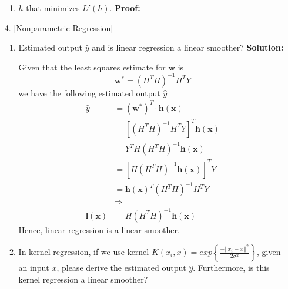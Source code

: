 \documentclass{article}
\renewcommand{\b}[1]{\bm{#1}}
\begin{document}
\begin{enumerate}
\begin{enumerate}
		      \item $h$ that minimizes $L'(h)$.\newline
		      {\bf Proof:}
          \par 
	      \end{enumerate}
	\item [4.] [Nonparametric Regression]
	      \begin{enumerate}
		      \setlength\parindent{2em}
		      \item Estimated output $\hat{y}$ and is linear regression a linear smoother?\newline
		      {\bf Solution:}
          \par Given that the least squares estimate for $\b{w}$ is 
          \[\b{w}^*=\left(H^TH\right)^{-1}H^TY\]
          we have the following estimated output $\hat{y}$
          \begin{align*}
            \hat{y} &= (\b{w}^*)^T\cdot\b{h(x)}\\
            &= \left[\left(H^TH\right)^{-1}H^TY\right]^T\b{h(x)}\\
            &= Y^TH\left(H^TH\right)^{-1}\b{h(x)}\\
            &= \left[H\left(H^TH\right)^{-1}\b{h(x)}\right]^TY\\
            &= \b{h(x)}^T\left(H^TH\right)^{-1}H^TY\\
            &\Rightarrow\\
            \b{l(x)} &= H\left(H^TH\right)^{-1}\b{h(x)}
          \end{align*}
          Hence, linear regression is a linear smoother.
		      \item In kernel regression, if we use kernel $K(x_i,x)=exp\left\{\frac{-||x_i-x||^2}{2\sigma^2}\right\}$, given an input $x$, please derive the estimated output $\hat{y}$. Furthermore, is this kernel regression a linear smoother?
	      \end{enumerate}
\end{enumerate}
\end{document}
